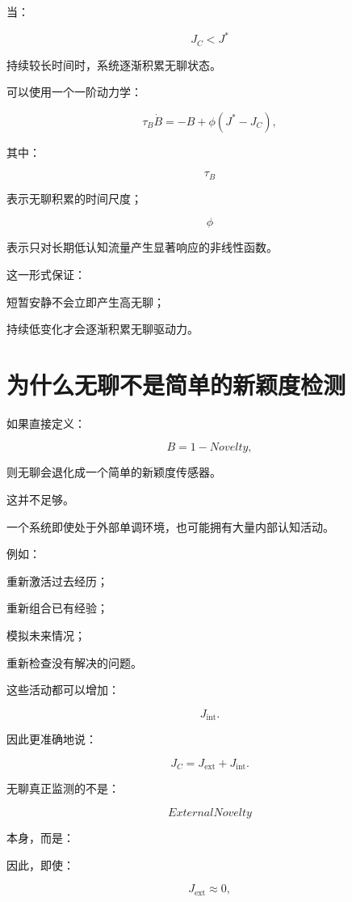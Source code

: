 当：

\[
J_C<J^*
\]

持续较长时间时，系统逐渐积累无聊状态。

可以使用一个一阶动力学：

\[
\boxed{
\tau_B\dot B
=
-B
+
\phi
\left(
J^*-J_C
\right),
}
\]

其中：

\[
\tau_B
\]

表示无聊积累的时间尺度；

\[
\phi
\]

表示只对长期低认知流量产生显著响应的非线性函数。

这一形式保证：

短暂安静不会立即产生高无聊；

持续低变化才会逐渐积累无聊驱动力。

\section{为什么无聊不是简单的新颖度检测}

如果直接定义：

\[
B=1-Novelty,
\]

则无聊会退化成一个简单的新颖度传感器。

这并不足够。

一个系统即使处于外部单调环境，也可能拥有大量内部认知活动。

例如：

重新激活过去经历；

重新组合已有经验；

模拟未来情况；

重新检查没有解决的问题。

这些活动都可以增加：

\[
J_{\mathrm{int}}.
\]

因此更准确地说：

\[
\boxed{
J_C
=
J_{\mathrm{ext}}
+
J_{\mathrm{int}}.
}
\]

无聊真正监测的不是：

\[
ExternalNovelty
\]

本身，而是：

\begin{statementbox}
\centering
{}
\end{statementbox}

因此，即使：

\[
J_{\mathrm{ext}}\approx0,
\]

